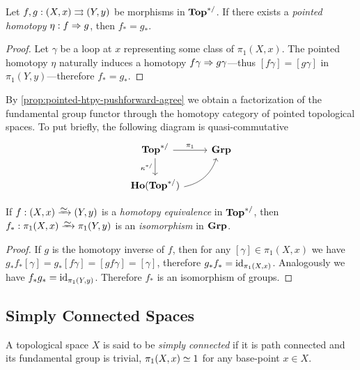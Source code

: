 \begin{proposition}
\label{prop:pointed-htpy-pushforward-agree}
Let \(f, g: (X, x) \rightrightarrows (Y, y)\) be morphisms in \({\textbf{Top}^{*/}}\). If there exists a
\emph{pointed homotopy} \(\eta: f \Rightarrow g\), then \(f_{*} = g_{*}\).
\end{proposition}

\begin{proof}
Let \(\gamma\) be a loop at \(x\) representing some class of \(\pi_1(X,
x)\). The pointed homotopy \(\eta\) naturally induces a homotopy
\(f \gamma \Rightarrow g \gamma\)---thus \([f \gamma] = [g \gamma]\) in
\(\pi_1(Y, y)\)---therefore \(f_{*} = g_{*}\).
\end{proof}

By \cref{prop:pointed-htpy-pushforward-agree} we obtain a factorization of the
fundamental group functor through the homotopy category of pointed topological
spaces. To put briefly, the following diagram is quasi-commutative
\[
\begin{tikzcd}
\bpTop \ar[r, "\pi_1"] \ar[d, "\kappa^{*/}"'] &\Grp \\
\Ho{\bpTop} \ar[ru, bend right]
\end{tikzcd}
\]

\begin{corollary}
\label{cor:pushforward-preserve-isomorphism}
If \(f: (X, x) \isoto (Y, y)\) is a \emph{homotopy equivalence} in \({\textbf{Top}^{*/}}\),
then \(f_{*}: \pi_1(X, x) \isoto \pi_1(Y, y)\) is an \emph{isomorphism} in
\({\textbf{Grp}}\).
\end{corollary}

\begin{proof}
If \(g\) is the homotopy inverse of \(f\), then for any
\([\gamma] \in \pi_1(X, x)\) we have
\(g_{*}f_{*} [\gamma] = g_{*}[f \gamma] = [g f \gamma] = [\gamma]\), therefore
\(g_{*} f_{*} = \operatorname{id}_{\pi_1(X, x)}\). Analogously we have
\(f_{*} g_{*} = \operatorname{id}_{\pi_1(Y, y)}\). Therefore \(f_{*}\) is an isomorphism of
groups.
\end{proof}

\subsection{Simply Connected Spaces}

\begin{definition}
\label{def:simply-connected}
A topological space \(X\) is said to be \emph{simply connected} if it is path
connected and its fundamental group is
trivial, \(\pi_1(X, x) \simeq 1\) for any base-point \(x \in X\).
\end{definition}


